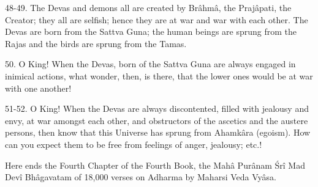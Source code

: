 48-49. The Devas and demons all are created by Br\^ahm\^a, the Praj\^apati, the Creator; they all are selfish; hence they are at war and war with each other. The Devas are born from the Sattva Guna; the human beings are sprung from the Rajas and the birds are sprung from the Tamas.

50. O King! When the Devas, born of the Sattva Guna are always engaged in inimical actions, what wonder, then, is there, that the lower ones would be at war with one another!

51-52. O King! When the Devas are always discontented, filled with jealousy and envy, at war amongst each other, and obstructors of the ascetics and the austere persons, then know that this Universe has sprung from Ahamk\^ara (egoism). How can you expect them to be free from feelings of anger, jealousy; etc.!

Here ends the Fourth Chapter of the Fourth Book, the Mah\^a Pur\^anam \'Sr\^i Mad Dev\^i Bh\^agavatam of 18,000 verses on Adharma by Maharsi Veda Vy\^asa.